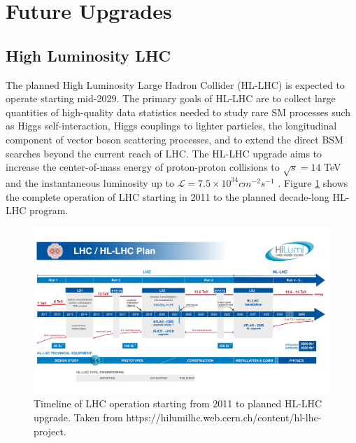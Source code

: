 \section{Future Upgrades}
\label{sec:FutureUpgrades}

\subsection{High Luminosity LHC}
\label{subsec:HLLHC}
The planned High Luminosity Large Hadron Collider (HL-LHC) is expected to operate starting mid-2029. The primary goals of HL-LHC are to collect large quantities of high-quality data statistics needed to study rare SM processes such as Higgs self-interaction, Higgs couplings to lighter particles, the longitudinal component of vector boson scattering processes, and to extend the direct BSM searches beyond the current reach of LHC. The HL-LHC upgrade aims to increase the center-of-mass energy of proton-proton collisions to $\sqrt{s}=14$ TeV and the instantaneous luminosity up to $\mathcal L = 7.5 \times 10^{34} cm^{-2}s^{-1}$ \cite{HLLHC}. Figure \ref{fig:HLLHC} shows the complete operation of LHC starting in 2011 to the planned decade-long HL-LHC program. 

\begin{figure}
    \centering
    \includegraphics[width=.95\linewidth]{figures/LHC/HLLHCPlan.jpeg}
    \caption{ Timeline of LHC operation starting from 2011 to planned HL-LHC upgrade. Taken from \small{https://hilumilhc.web.cern.ch/content/hl-lhc-project}.\label{fig:HLLHC}}
\end{figure}
\normalsize

